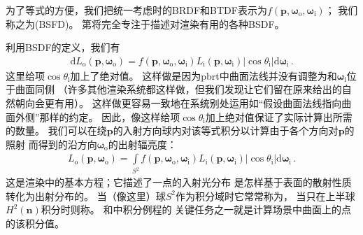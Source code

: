 为了等式的方便，我们把统一考虑时的BRDF和BTDF表示为$f({\bm p},{\bm \omega}_\mathrm{o},{\bm \omega}_\mathrm{i})$；
我们称之为(BSFD)。
第将完全专注于描述对渲染有用的各种BSDF。

利用BSDF的定义，我们有
\begin{align*}
    \mathrm{d}L_{\mathrm{o}}({\bm p},{\bm\omega}_{\mathrm{o}})=f({\bm p},{\bm \omega}_\mathrm{o},{\bm \omega}_\mathrm{i})L_{\mathrm{i}}({\bm p},{\bm\omega}_{\mathrm{i}})|\cos\theta_{\mathrm{i}}|\mathrm{d}{\bm\omega}_{\mathrm{i}}\, .
\end{align*}
这里给项$\cos\theta_{\mathrm{i}}$加上了绝对值。
这样做是因为pbrt中曲面法线并没有调整为和${\bm\omega}_{\mathrm{i}}$位于曲面同侧
（许多其他渲染系统都这样做，但我们发现让它们留在原来给出的自然朝向会更有用）。
这样做更容易一致地在系统别处运用如“假设曲面法线指向曲面外侧”那样的约定。
因此，像这样给项$\cos\theta_{\mathrm{i}}$加上绝对值保证了实际计算出所需的数量。
我们可以在绕$\bm p$的入射方向球内对该等式积分以计算由于各个方向对$\bm p$的照射
而得到的沿方向${\bm\omega}_{\mathrm{o}}$的出射辐亮度：
\begin{align}\label{eq:5.9}
    L_{\mathrm{o}}({\bm p},{\bm\omega}_{\mathrm{o}})=\int\limits_{S^2}f({\bm p},{\bm \omega}_\mathrm{o},{\bm \omega}_\mathrm{i})L_{\mathrm{i}}({\bm p},{\bm\omega}_{\mathrm{i}})|\cos\theta_{\mathrm{i}}|\mathrm{d}{\bm\omega}_{\mathrm{i}}\, .
\end{align}
这是渲染中的基本方程；它描述了一点的入射光分布
是怎样基于表面的散射性质转化为出射分布的。
当（像这里）球$S^2$作为积分域时它常常称为，
当只在上半球$H^2({\bm n})$积分时则称。
和中积分例程的
关键任务之一就是计算场景中曲面上的点的该积分值。

